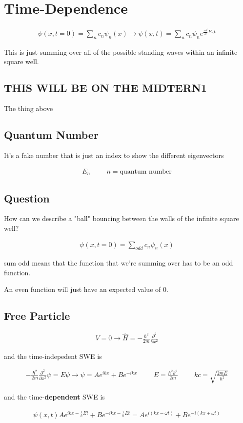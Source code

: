 \documentclass[fleqn]{report}
\newcommand{\hp}{\hspace{1cm}}
\newcommand{\del}{\partial}
\newcommand{\equations} [1] {
\begin{gather*}
#1
\end{gather*}
}
\begin{document}
\section{Time-Dependence}
\equations{
    \psi(x, t=0)
    =
    \sum_n c_n \psi_n(x)
    \rightarrow 
    \psi(x, t)
    =
    \sum_n c_n \psi_n e^{\frac{-i}{\hbar} E_n t}
}

This is just summing over all of the possible standing waves within 
an infinite square well. 

\subsection{THIS WILL BE ON THE MIDTERN1}
The thing above 

\subsection{Quantum Number}
It's a fake number that is just an index to show the different eigenvectors 
\equations{
    E_n
    \hp 
    n = 
    \textrm{quantum number}
}

\subsection*{Question}
How can we describe a "ball" bouncing between the walls 
of the infinite square well? 

\equations{
    \psi(x, t=0)
    =
    \sum_{odd}
    c_n \psi_n(x)
}
sum odd means that the function that we're summing over has to be an odd function. 

An even function will just have an expected value of 0.

\subsection{Free Particle}
\equations{
    V= 0 
    \rightarrow 
    \hat H 
    =
    -
    \frac{\hbar^2}{2m}
    \frac{\del^2}{\del x^2}
}
and the time-indepedent SWE is 
\equations{
    -
    \frac{\hbar^2}{2m}
    \frac{\del^2}{\del x^2}
    \psi
    =
    E \psi
    \rightarrow 
    \psi 
    =
    A e^{ikx} + B e^{-ikx}
    \hp 
    E = \frac{\hbar^2 k^2}{2m}
    \hp 
    kc=
    \sqrt{\frac{2mE}{\hbar^2}}
}

and the time-\textbf{dependent} SWE is 


\equations{
    \psi(x, t)
    A e^{ikx - \frac{i}{\hbar} E t}
    +
    B e^{-ikx - \frac{i}{\hbar} E t}
    =
    A e^{i(kx - \omega t)}
    +
    B e^{-i(kx + \omega t)}
}
\end{document}

